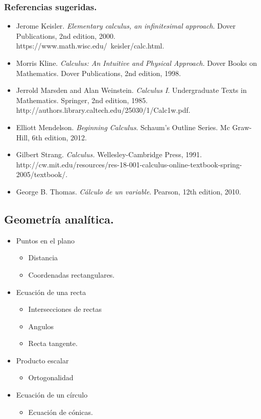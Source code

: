\documentclass[10pt,a4paper]{book}
\begin{document}
\subsubsection{Referencias sugeridas.}

\begin{itemize}
	\item Jerome Keisler. \textit{Elementary calculus, an infinitesimal approach}. Dover Publications, 2nd edition, 2000. https://www.math.wisc.edu/~keisler/calc.html.
	\item Morris Kline. \textit{Calculus: An Intuitive and Physical Approach.} Dover Books on Mathematics. Dover Publications, 2nd edition, 1998.
	\item Jerrold Marsden and Alan Weinstein. \textit{Calculus I}. Undergraduate Texts in Mathematics. Springer, 2nd edition, 1985. http://authors.library.caltech.edu/25030/1/Calc1w.pdf.
	 \item Elliott Mendelson. \textit{Beginning Calculus}. Schaum’s Outline Series. Mc Graw-Hill, 6th edition, 2012.
	 \item Gilbert Strang.\textit{ Calculus.} Wellesley-Cambridge Press, 1991. http://cw.mit.edu/resources/res-18-001-calculus-online-textbook-spring-2005/textbook/.
	 \item George B. Thomas. \textit{Cálculo de un variable}. Pearson, 12th edition, 2010.
\end{itemize}
\newpage
\subsection{Geometría analítica.}
\begin{itemize}
	\item Puntos en el plano 
	\begin{itemize}
		\item Distancia
		\item Coordenadas rectangulares.
	\end{itemize}		
	\item Ecuación de una recta
	\begin{itemize}
		\item Intersecciones de rectas
		\item Angulos
		\item Recta tangente.
	\end{itemize}	
	\item Producto escalar
	\begin{itemize}
		\item Ortogonalidad
	\end{itemize}
	\item Ecuación de un círculo
	\begin{itemize}
		\item Ecuación de cónicas.
	\end{itemize}		
\end{itemize}
\end{document}
